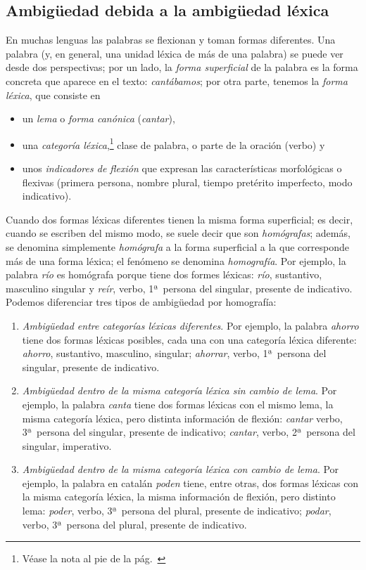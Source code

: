 \subsection{Ambigüedad debida a la ambigüedad léxica} \label{ss:amblex} En muchas lenguas las palabras se flexionan y toman formas diferentes. Una palabra (y, en general, una unidad léxica de más de una palabra) se puede ver desde dos perspectivas; por un lado, la \emph{forma superficial} de la palabra es la forma concreta que aparece en el texto: \emph{cantábamos}; por otra parte, tenemos la \emph{forma léxica}, que consiste en \begin{itemize} \item un \emph{lema} o \emph{forma canónica} (\emph{cantar}), \item una \emph{categoría léxica},\label{pg:catlex}\footnote{Véase la nota al pie de la pág.~\pageref{pg:catgra}} clase de palabra, o parte de la oración (verbo) y \item unos \emph{indicadores de flexión} que expresan las características morfológicas o flexivas (primera persona, nombre plural, tiempo pretérito imperfecto, modo indicativo). \end{itemize} Cuando dos formas léxicas diferentes tienen la misma forma superficial; es decir, cuando se escriben del mismo modo, se suele decir que son \emph{homógrafas}\label{pg:homografia}; además, se denomina simplemente \emph{homógrafa} a la forma superficial a la que corresponde más de una forma léxica; el fenómeno se denomina \emph{homografía}. Por ejemplo, la palabra \emph{río} es homógrafa porque tiene dos formes léxicas: \emph{río}, sustantivo, masculino singular y \emph{reír}, verbo, 1ª\ persona del singular, presente de indicativo.   Podemos diferenciar tres tipos de ambigüedad por homografía: \begin{enumerate} \item \emph{Ambigüedad entre categorías léxicas diferentes}. Por ejemplo, la palabra \emph{ahorro} tiene dos formas léxicas posibles, cada una con una categoría léxica diferente: \emph{ahorro}, sustantivo, masculino, singular; \emph{ahorrar}, verbo, 1ª\ persona del singular, presente de indicativo. \item \emph{Ambigüedad dentro de la misma categoría léxica sin cambio de lema}. Por ejemplo, la palabra \emph{canta} tiene dos formas léxicas con el mismo lema, la misma categoría léxica, pero distinta información de flexión: \emph{cantar} verbo, 3ª\ persona del singular, presente de indicativo; \emph{cantar}, verbo, 2ª\ persona del singular, imperativo. \item \emph{Ambigüedad dentro de la misma categoría léxica con cambio de lema}. Por ejemplo, la palabra en catalán \emph{poden} tiene, entre otras, dos formas léxicas con la misma categoría léxica, la misma información de flexión, pero distinto lema: \emph{poder}, verbo, 3ª\ persona del plural, presente de indicativo; \emph{podar}, verbo, 3ª\ persona del plural, presente de indicativo. \end{enumerate} 

